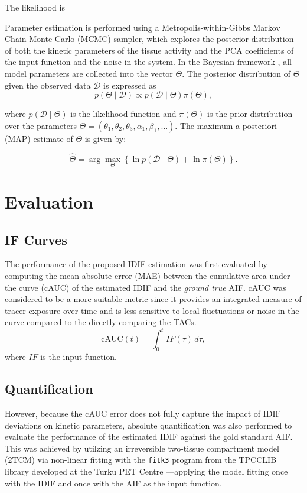 The likelihood is 


Parameter estimation is performed using a Metropolis-within-Gibbs Markov Chain Monte Carlo (MCMC) sampler, which explores the posterior distribution of both the kinetic parameters of the tissue activity and the PCA coefficients of the input function and the noise in the system.
In the Bayesian framework \cite{irace2021bayesian}, all model parameters are collected into the vector $\Theta$. The posterior distribution of $\Theta$ given the observed data $\mathcal{D}$ is expressed as
\begin{equation}
	p(\Theta \mid \mathcal{D}) \propto p(\mathcal{D} \mid \Theta) \pi(\Theta),
\end{equation}

where \( p(\mathcal{D} \mid \Theta) \) is the likelihood function and \( \pi(\Theta) \) is the prior distribution over the parameters \( \Theta = (\theta_{1}, \theta_{2}, \theta_{3}, \alpha_{1}, \beta_{1}, \dots) \). The maximum a posteriori (MAP) estimate of \( \Theta \) is given by:

\begin{equation}
	\hat{\Theta}
	=
	\arg\max_{\Theta}
	\left\{
	\ln p(\mathcal{D} \mid \Theta)
	+
	\ln \pi(\Theta)
	\right\}.
\end{equation}

\section{Evaluation}
\subsection{IF Curves}
The performance of the proposed IDIF estimation was first evaluated by computing the mean absolute error (MAE) between the cumulative area under the curve (cAUC) of the estimated IDIF and the \textit{ground true} AIF. cAUC was considered to be a more suitable metric since it provides an integrated measure of tracer exposure over time and is less sensitive to local fluctuations or noise in the curve compared to the directly comparing the TACs.
\begin{equation}
	\textrm{cAUC}(t) =  \int_{0}^{t} IF(\tau) \, d\tau,
\end{equation}
where \(IF\) is the input function.

\subsection{Quantification}
However, because the cAUC error does not fully capture the impact of IDIF deviations on kinetic parameters, absolute quantification was also performed to evaluate the performance of the estimated IDIF against the gold standard AIF.
This was achieved by utilzing an irreversible two-tissue compartment model (2TCM) via non-linear fitting with the \texttt{fitk3} program from the TPCCLIB library developed at the Turku PET Centre \cite{oikonen2018tpcclib}—applying the model fitting once with the IDIF and once with the AIF as the input function.

